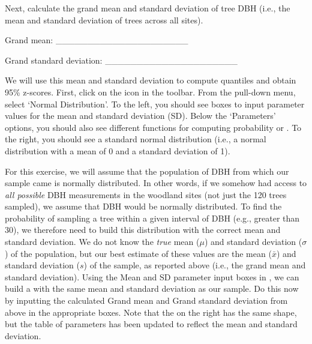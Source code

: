 \documentclass[
  openany]{krantz}
\begin{document}
\begin{verbatim}






\end{verbatim}

Next, calculate the grand mean and standard deviation of tree DBH (i.e., the mean and standard deviation of trees across all sites).

Grand mean: \_\_\_\_\_\_\_\_\_\_\_\_\_\_\_\_\_\_\_\_\_

Grand standard deviation: \_\_\_\_\_\_\_\_\_\_\_\_\_\_\_\_\_\_\_\_\_

We will use this mean and standard deviation to compute quantiles and obtain 95\% z-scores.
First, click on the  icon in the toolbar.
From the  pull-down menu, select `Normal Distribution'.
To the left, you should see boxes to input parameter values for the mean and standard deviation (SD).
Below the `Parameters' options, you should also see different functions for computing probability or .
To the right, you should see a standard normal distribution (i.e., a normal distribution with a mean of 0 and a standard deviation of 1).

For this exercise, we will assume that the population of DBH from which our sample came is normally distributed.
In other words, if we somehow had access to \emph{all possible} DBH measurements in the woodland sites (not just the 120 trees sampled), we assume that DBH would be normally distributed.
To find the probability of sampling a tree within a given interval of DBH (e.g., greater than 30), we therefore need to build this distribution with the correct mean and standard deviation.
We do not know the \emph{true} mean (\(\mu\)) and standard deviation (\(\sigma\)) of the population, but our best estimate of these values are the mean (\(\bar{x}\)) and standard deviation (\(s\)) of the sample, as reported above (i.e., the grand mean and standard deviation).
Using the Mean and SD parameter input boxes in , we can build a  with the same mean and standard deviation as our sample.
Do this now by inputting the calculated Grand mean and Grand standard deviation from above in the appropriate boxes.
Note that the  on the right has the same shape, but the table of parameters has been updated to reflect the mean and standard deviation.
\end{document}
